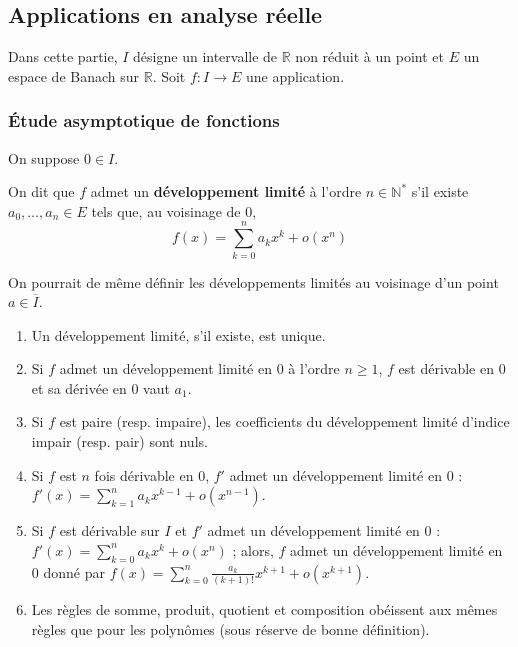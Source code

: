 	\subsection{Applications en analyse réelle}

	Dans cette partie, $I$ désigne un intervalle de $\mathbb{R}$ non réduit à un point et $E$ un espace de Banach sur $\mathbb{R}$. Soit $f : I \rightarrow E$ une application.

	\subsubsection{Étude asymptotique de fonctions}


	On suppose $0 \in I$.

	\begin{definition}
		On dit que $f$ admet un \textbf{développement limité} à l'ordre $n \in \mathbb{N}^*$ s'il existe $a_0, \dots, a_n \in E$ tels que, au voisinage de $0$,
		\[ f(x) = \sum_{k=0}^{n} a_k x^k + o(x^n) \]
	\end{definition}

	\begin{remark}
		On pourrait de même définir les développements limités au voisinage d'un point $a \in \overline{I}$.
	\end{remark}

	\begin{proposition}
		\begin{enumerate}[label=(\roman*)]
			\item Un développement limité, s'il existe, est unique.
			\item Si $f$ admet un développement limité en $0$ à l'ordre $n \geq 1$, $f$ est dérivable en $0$ et sa dérivée en $0$ vaut $a_1$.
			\item Si $f$ est paire (resp. impaire), les coefficients du développement limité d'indice impair (resp. pair) sont nuls.
			\item Si $f$ est $n$ fois dérivable en $0$, $f'$ admet un développement limité en $0$ : $f'(x) = \sum_{k=1}^{n} a_k x^{k-1} + o(x^{n-1})$.
			\item Si $f$ est dérivable sur $I$ et $f'$ admet un développement limité en $0$ : $f'(x) = \sum_{k=0}^{n} a_k x^k + o(x^n)$ ; alors, $f$ admet un développement limité en $0$ donné par $f(x) = \sum_{k=0}^{n} \frac{a_k}{(k+1)!} x^{k+1} + o(x^{k+1})$.
			\item Les règles de somme, produit, quotient et composition obéissent aux mêmes règles que pour les polynômes (sous réserve de bonne définition).
		\end{enumerate}
	\end{proposition}

